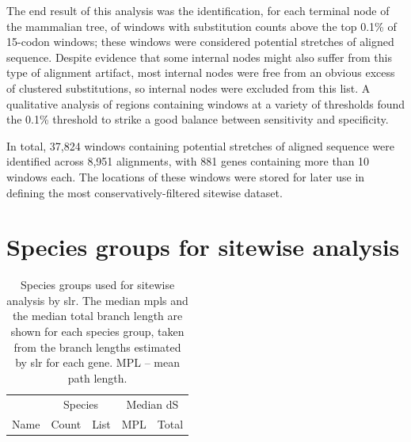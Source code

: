 
The end result of this analysis was the identification, for each
terminal node of the mammalian tree, of windows with \nsyn
substitution counts above the top 0.1\% of 15-codon windows; these
windows were considered potential stretches of \nhom aligned
sequence. Despite evidence that some internal nodes might also suffer
from this type of alignment artifact, most internal nodes were free
from an obvious excess of clustered \nsyn substitutions, so internal
nodes were excluded from this list. A qualitative analysis of regions
containing windows at a variety of thresholds found the 0.1\%
threshold to strike a good balance between sensitivity and
specificity.

In total, 37,824 windows containing potential stretches of \nhom
aligned sequence were identified across 8,951 alignments, with 881
genes containing more than 10 windows each. The locations of these
windows were stored for later use in defining the most
conservatively-filtered sitewise dataset.


\section{Species groups for sitewise analysis}

\begin{table}
\centering \footnotesize
\begin{tabular}{lrb{8cm}rr}
\toprule
 & \multicolumn{2}{c}{Species} & \multicolumn{2}{c}{Median dS} \\
\cmidrule(r){2-3} \cmidrule{4-5}
Name & Count & List & MPL & Total \\
  \midrule

\bottomrule
\end{tabular}
\caption{Species groups used for sitewise analysis by \ac{slr}. The
  median \acp{mpl} and the median total branch length are shown for
  each species group, taken from the \ntrees branch lengths estimated
  by \ac{slr} for each gene. MPL -- mean path length.}
\label{table_species_set_summary}
\end{table}

